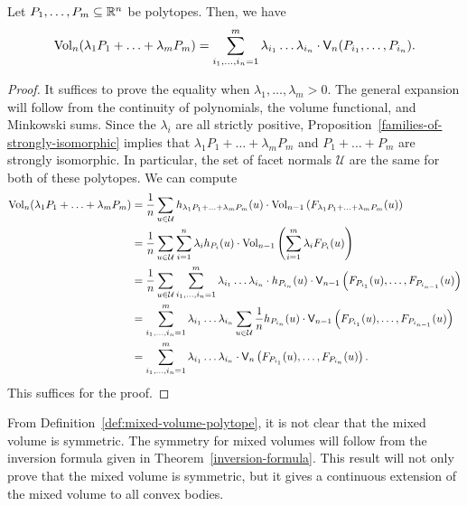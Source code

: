 \documentclass{puthesis-UG}
\begin{document}
\begin{thm} \label{mixed-volume-polynomial-expansion}
	Let $P_1, \ldots, P_m \subseteq \mathbb{R}^n$ be polytopes. Then, we have 
	\[
		\operatorname{Vol}_n(\lambda_1 P_1 + \ldots + \lambda_m P_m) = \sum_{i_1, \ldots, i_n = 1}^m \lambda_{i_1} \ldots \lambda_{i_n} \cdot \mathsf{V}_n (P_{i_1}, \ldots, P_{i_n}).
	\]
\end{thm}

\begin{proof}
	It suffices to prove the equality when $\lambda_1, \ldots, \lambda_m > 0$. The general expansion will follow from the continuity of polynomials, the volume functional, and Minkowski sums. Since the $\lambda_i$ are all strictly positive, Proposition~\ref{families-of-strongly-isomorphic} implies that $\lambda_1 P_1 + \ldots + \lambda_m P_m$ and $P_1 + \ldots + P_m$ are strongly isomorphic. In particular, the set of facet normals $\mathcal{U}$ are the same for both of these polytopes. We can compute 
	\begin{align*}
		\operatorname{Vol}_n (\lambda_1 P_1 + \ldots + \lambda_m P_m) & = \frac{1}{n} \sum_{u \in \mathcal{U}} h_{\lambda_1 P_1 + \ldots + \lambda_m P_m}(u) \cdot \operatorname{Vol}_{n-1} \left ( F_{\lambda_1 P_1 + \ldots + \lambda_m P_m} (u) \right ) \\
		& = \frac{1}{n} \sum_{u \in \mathcal{U}} \sum_{i = 1}^n \lambda_i h_{P_i}(u) \cdot \operatorname{Vol}_{n-1} \left ( \sum_{i = 1}^m \lambda_i F_{P_i}(u) \right ) \\
		& = \frac{1}{n} \sum_{u \in \mathcal{U}} \sum_{i_1, \ldots, i_n = 1}^m \lambda_{i_1} \ldots \lambda_{i_n} \cdot h_{P_{i_n}}(u) \cdot \mathsf{V}_{n-1} \left (F_{P_{i_1}}(u), \ldots, F_{P_{i_{n-1}}}(u) \right ) \\
		& = \sum_{i_1, \ldots, i_n = 1}^m \lambda_{i_1} \ldots \lambda_{i_n} \sum_{u \in \mathcal{U}} \frac{1}{n} h_{P_{i_n}}(u) \cdot \mathsf{V}_{n-1} \left (F_{P_{i_1}}(u), \ldots, F_{P_{i_{n-1}}}(u) \right ) \\
		& = \sum_{i_1, \ldots, i_n = 1}^m \lambda_{i_1} \ldots \lambda_{i_n} \cdot \mathsf{V}_n \left (F_{P_{i_1}}(u), \ldots, F_{P_{i_{n}}}(u) \right ). 
	\end{align*}
	This suffices for the proof. 
\end{proof}

From Definition~\ref{def:mixed-volume-polytope}, it is not clear that the mixed volume is symmetric. The symmetry for mixed volumes will follow from the inversion formula given in Theorem~\ref{inversion-formula}. This result will not only prove that the mixed volume is symmetric, but it gives a continuous extension of the mixed volume to all convex bodies.
\end{document}
